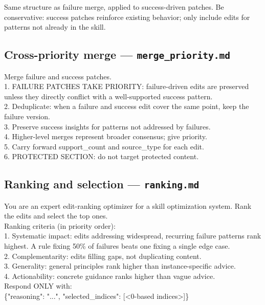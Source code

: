 \documentclass[11pt,a4paper]{article}
\begin{document}
Same structure as failure merge, applied to success-driven patches. Be
conservative: success patches reinforce existing behavior; only include
edits for patterns not already in the skill.

\subsection{Cross-priority merge --- \texttt{merge\_priority.md}}

\begin{promptbox}
Merge failure and success patches.\\[0.4em]
1. FAILURE PATCHES TAKE PRIORITY: failure-driven edits are preserved
unless they directly conflict with a well-supported success pattern.\\
2. Deduplicate: when a failure and success edit cover the same point,
keep the failure version.\\
3. Preserve success insights for patterns not addressed by failures.\\
4. Higher-level merges represent broader consensus; give priority.\\
5. Carry forward support\_count and source\_type for each edit.\\
6. PROTECTED SECTION: do not target protected content.
\end{promptbox}

\subsection{Ranking and selection --- \texttt{ranking.md}}

\begin{promptbox}
You are an expert edit-ranking optimizer for a skill optimization
system. Rank the edits and select the top ones.\\[0.4em]
Ranking criteria (in priority order):\\
1. Systematic impact: edits addressing widespread, recurring failure
patterns rank highest. A rule fixing 50\% of failures beats one fixing
a single edge case.\\
2. Complementarity: edits filling gaps, not duplicating content.\\
3. Generality: general principles rank higher than instance-specific
advice.\\
4. Actionability: concrete guidance ranks higher than vague advice.\\[0.4em]
Respond ONLY with:\\
\{"reasoning": "...", "selected\_indices": [<0-based indices>]\}
\end{promptbox}
\end{document}
